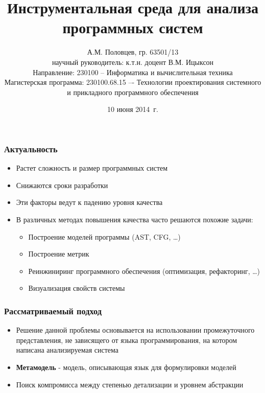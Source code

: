 \documentclass{beamer}
\title[Инструментальная среда]{Инструментальная среда для анализа программных систем}
\author[А.М. Половцев]{
    А.М. Половцев, гр. 63501/13\\
    научный руководитель: к.т.н. доцент В.М. Ицыксон\\[3ex]
    Направление: 230100 -- Информатика и вычислительная техника\\
    Магистерская программа: 230100.68.15 –- Технологии проектирования
системного и прикладного программного обеспечения
}
\institute[СПбГПУ]{Санкт-Петербургский государственный политехнический университет}
\date[10 июня 2014~г.]{10 июня 2014~г.}
\begin{document}
\frame{\titlepage}
\begin{frame}
\frametitle{Актуальность}

\begin{itemize}
    \item Растет сложность и размер программных систем
    \item Снижаются сроки разработки
    \item Эти факторы ведут к падению уровня качества
    \item В различных методах повышения качества часто решаются похожие задачи:
    \begin{itemize}
        \item Построение моделей программы (AST, CFG, \ldots)
        \item Построение метрик
        \item Реинжиниринг программного обеспечения (оптимизация, рефакторинг, \ldots)
        \item Визуализация свойств системы
    \end{itemize}
\end{itemize}

\begin{alertblock}{}
\end{alertblock}

\end{frame}
\begin{frame}
\frametitle{Рассматриваемый подход}

\begin{itemize}
    \item Решение данной проблемы основывается на использовании промежуточного
    представления, не зависящего от языка программирования, на котором написана
    анализируемая система
    \item \textbf{Метамодель} - модель, описывающая язык для формулировки моделей
    \item Поиск компромисса между степенью детализации и уровнем абстракции
\end{itemize}

\end{frame}
\end{document}
